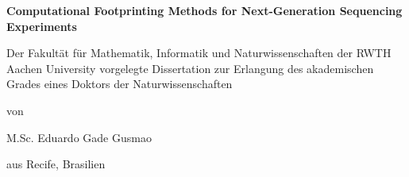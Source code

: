 \begin{titlepage}
\large
\begin{center}

\begin{doublespacing} 

\vspace*{1cm}

{\Large{\bf{Computational Footprinting Methods for Next-Generation Sequencing Experiments}}}



\vspace{2cm}

\begin{minipage}[b]{14cm}
\centering
Der Fakult\"at f\"ur Mathematik, Informatik und Naturwissenschaften der RWTH Aachen University vorgelegte Dissertation zur Erlangung des akademischen Grades eines Doktors der Naturwissenschaften
\end{minipage}

\vspace{2cm}

von

M.Sc. Eduardo Gade Gusmao


aus Recife, Brasilien

\end{doublespacing} 
\end{center}

\pagestyle{empty}







\cleardoublepage
\end{titlepage}


